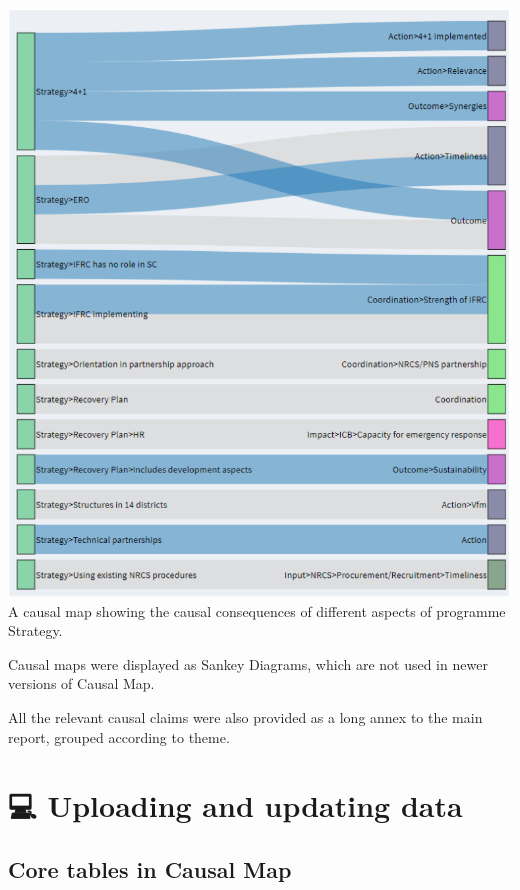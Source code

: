 \documentclass[
]{book}
\begin{document}
\includegraphics{_assets/19e34962dab6bd291d2b0de83a90478a.png}A causal map showing the causal consequences of different aspects of programme Strategy.

Causal maps were displayed as Sankey Diagrams, which are not used in newer versions of Causal Map.

All the relevant causal claims were also provided as a long annex to the main report, grouped according to theme.

\hypertarget{part-uploading-and-updating-data}{%
\part{💻 Uploading and updating data}\label{part-uploading-and-updating-data}}

\hypertarget{core-tables-in-causal-map}{%
\chapter{Core tables in Causal Map}\label{core-tables-in-causal-map}}
\end{document}
